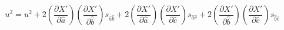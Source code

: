\documentclass[12pt]{article}
\begin{document}
\pagestyle{empty}
\Large
{}
\pagecolor{ehandbook}


\[
u^{2} = u^{2} + 
2 \left( \frac{\partial{X'}}{\partial{\hat{a}}}\right)  
  \left( \frac{\partial{X'}}{\partial{\hat{b}}}\right) s_{\hat{a}\hat{b}} + 
2 \left( \frac{\partial{X'}}{\partial{\hat{a}}}\right)  
  \left( \frac{\partial{X'}}{\partial{\hat{c}}}\right) s_{\hat{a}\hat{c}} +
2 \left( \frac{\partial{X'}}{\partial{\hat{b}}}\right)
  \left( \frac{\partial{X'}}{\partial{\hat{c}}}\right) s_{\hat{b}\hat{c}}
\]
\end{document}
